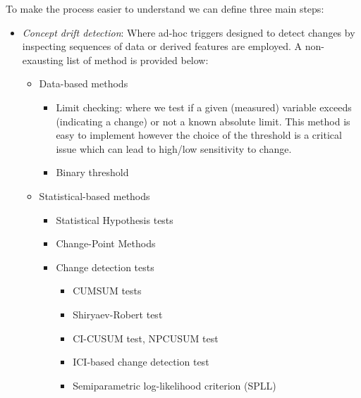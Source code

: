 \documentclass{article}
\begin{document}
      To make the process easier to understand we can define three main steps:
      \begin{itemize}
        \item \emph{Concept drift detection}: Where ad-hoc triggers designed to detect changes by inspecting sequences of data or derived features are employed. A non-exausting list of method is provided below:
        \begin{itemize}
          \item Data-based methods
          \begin{itemize}
            \item Limit checking: where we test if a given (measured) variable exceeds (indicating a change) or not a known absolute limit. This method is easy to implement however the choice of the threshold is a critical issue which can lead to high/low sensitivity to change.
            \item Binary threshold
          \end{itemize}
          \item Statistical-based methods
          \begin{itemize}
            \item Statistical Hypothesis tests
            \item Change-Point Methods
            \item Change detection tests
            \begin{itemize}
              \item CUMSUM tests
              \item Shiryaev-Robert test
              \item CI-CUSUM test, NPCUSUM test
              \item ICI-based change detection test
              \item Semiparametric log-likelihood criterion (SPLL)
            \end{itemize}
          \end{itemize}
        \end{itemize}


\end{itemize}
\end{document}
